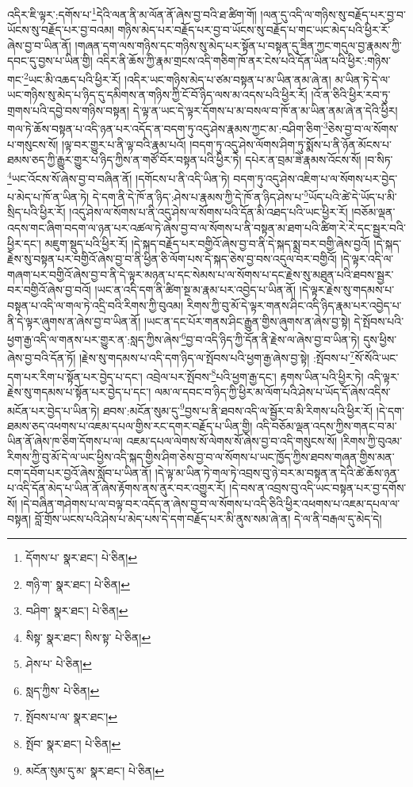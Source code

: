 འདིར་ཇི་ལྟར་:དགོས་པ་\footnote{དོགས་པ་  སྣར་ཐང་།  པེ་ཅིན། }དེའི་ལན་ནི་མ་ལོན་ནོ་ཞེས་བྱ་བའི་ཐ་ཚིག་གོ། །ལན་དུ་འདི་ལ་གཉིས་སུ་བརྗོད་པར་བྱ་བ་ཡོངས་སུ་བརྗོད་པར་བྱ་བའམ། གཉིས་མེད་པར་བརྗོད་པར་བྱ་བ་ཡོངས་སུ་བརྗོད་པ་གང་ཡང་མེད་པའི་ཕྱིར་རོ་ཞེས་བྱ་བ་ཡིན་ནོ། །གཞན་དག་ལས་གཉིས་དང་གཉིས་སུ་མེད་པར་སྟོན་པ་བསྟན་དུ་ཟིན་ཀྱང་གདུལ་བྱ་རྣམས་ཀྱི་དབང་དུ་བྱས་པ་ཡིན་གྱི། འདིར་ནི་ཆོས་ཀྱི་རྣམ་གྲངས་འདི་གཅིག་ཁོ་ནར་ངེས་པའི་དོན་ཡིན་པའི་ཕྱིར་:གཉིས་གང་\footnote{གཉི་ག་  སྣར་ཐང་།  པེ་ཅིན། }ཡང་མི་འཆད་པའི་ཕྱིར་རོ། །འདིར་ཡང་གཉིས་མེད་པ་ཙམ་བསྟན་པ་མ་ཡིན་ནམ་ཞེ་ན། མ་ཡིན་ཏེ་དེ་ལ་ཡང་གཉིས་སུ་མེད་པ་ཉིད་དུ་དམིགས་ན་གཉིས་ཀྱི་ངོ་བོ་ཉིད་ལས་མ་འདས་པའི་ཕྱིར་རོ། །འོ་ན་ཅིའི་ཕྱིར་རབ་ཏུ་གྲགས་པའི་དབྱེ་བས་གཉིས་བསྟན། དེ་ལྟ་ན་ཡང་དེ་ལྟར་དོགས་པ་མ་བསལ་བ་ཁོ་ན་མ་ཡིན་ནམ་ཞེ་ན་དེའི་ཕྱིར། གལ་ཏེ་ཆོས་བསྟན་པ་འདི་ཉན་པར་འདོད་ན་བདག་ཏུ་འདུ་ཤེས་རྣམས་ཀྱང་མ་:བཤིག་ཅིག་\footnote{བཤིག་  སྣར་ཐང་།  པེ་ཅིན། }ཅེས་བྱ་བ་ལ་སོགས་པ་གསུངས་སོ། །ལྟ་བར་གྱུར་པ་ནི་ལྟ་བའི་རྣམ་པའོ། །བདག་ཏུ་འདུ་ཤེས་ལོགས་ཤིག་ཏུ་སྨོས་པ་ནི་ཉོན་མོངས་པ་ཐམས་ཅད་ཀྱི་རྒྱུར་གྱུར་པ་ཉིད་ཀྱིས་ན་གཙོ་བོར་བསྟན་པའི་ཕྱིར་ཏེ། དཔེར་ན་བྲམ་ཟེ་རྣམས་འོངས་སོ། །བ་སིཏ་\footnote{སིསྟ་  སྣར་ཐང་། སིས་སྟ་  པེ་ཅིན། }ཡང་འོངས་སོ་ཞེས་བྱ་བ་བཞིན་ནོ། །དགོངས་པ་ནི་འདི་ཡིན་ཏེ། བདག་ཏུ་འདུ་ཤེས་འཇིག་པ་ལ་སོགས་པར་བྱེད་པ་མེད་པ་ཁོ་ན་ཡིན་ཏེ། དེ་དག་ནི་དེ་ཁོ་ན་ཉིད་:ཤེས་པ་རྣམས་ཀྱི་དེ་ཁོ་ན་ཉིད་ཤེས་པ་\footnote{ཤེས་པ་  པེ་ཅིན། }ཡོད་པའི་ཚེ་དེ་ཡོད་པ་མི་སྲིད་པའི་ཕྱིར་རོ། །འདུ་ཤེས་ལ་སོགས་པ་ནི་འདུ་ཤེས་ལ་སོགས་པའི་དོན་མི་འཐད་པའི་ཡང་ཕྱིར་རོ། །བཅོམ་ལྡན་འདས་གང་ཞིག་བདག་ལ་ཉན་པར་འཚལ་ཏེ་ཞེས་བྱ་བ་ལ་སོགས་པ་ནི་བསྟན་མ་ཐག་པའི་ཚིག་རེ་རེ་དང་སྦྱར་བའི་ཕྱིར་དང་། མཇུག་སྡུད་པའི་ཕྱིར་རོ། །དེ་སྐད་བརྗོད་པར་བགྱིའོ་ཞེས་བྱ་བ་ནི་དེ་སྐད་སྨྲ་བར་བགྱི་ཞེས་བྱའོ། །དེ་སྐད་རྗེས་སུ་བསྟན་པར་བགྱིའོ་ཞེས་བྱ་བ་ནི་ཕྱིན་ཅི་ལོག་པས་དེ་སྐད་ཅེས་བྱ་བས་འདུལ་བར་བགྱིའོ། །དེ་ལྟར་འདི་ལ་གཞག་པར་བགྱིའོ་ཞེས་བྱ་བ་ནི་དེ་ལྟར་མཉན་པ་དང་སེམས་པ་ལ་སོགས་པ་དང་རྗེས་སུ་མཐུན་པའི་ཐབས་སྦྱར་བར་བགྱིའོ་ཞེས་བྱ་བའོ། །ཡང་ན་འདི་དག་ནི་ཚིག་སྔ་མ་རྣམ་པར་འབྱེད་པ་ཡིན་ནོ། །དེ་ལྟར་རྗེས་སུ་གདམས་པ་བསྟན་པ་འདི་ལ་གལ་ཏེ་འདྲི་བའི་རིགས་ཀྱི་བུའམ། རིགས་ཀྱི་བུ་མོ་དེ་ལྟར་གནས་ཤིང་འདི་ཉིད་རྣམ་པར་འབྱེད་པ་ནི་དེ་ལྟར་ཞུགས་ན་ཞེས་བྱ་བ་ཡིན་ནོ། །ཡང་ན་དང་པོར་གནས་ཤིང་རྒྱུན་གྱིས་ཞུགས་ན་ཞེས་བྱ་སྟེ། དེ་སྤོབས་པའི་ཕྱག་རྒྱ་འདི་ལ་གནས་པར་གྱུར་ན་:སླད་ཀྱིས་ཞེས་\footnote{སླད་ཀྱིས་  པེ་ཅིན། }བྱ་བ་འདི་ཉིད་ཀྱི་དོན་ནི་རྗེས་ལ་ཞེས་བྱ་བ་ཡིན་ཏེ། དུས་ཕྱིས་ཞེས་བྱ་བའི་དོན་ཏོ། །རྗེས་སུ་གདམས་པ་འདི་དག་ཉིད་ལ་སྤོབས་པའི་ཕྱག་རྒྱ་ཞེས་བྱ་སྟེ། :སྤོབས་པ་\footnote{སྤོབས་པ་ལ་  སྣར་ཐང་། }སོ་སོའི་ཡང་དག་པར་རིག་པ་སྟོན་པར་བྱེད་པ་དང་། འབྲེལ་པར་སྤོབས་\footnote{སྤོབ་  སྣར་ཐང་།  པེ་ཅིན། }པའི་ཕྱག་རྒྱ་དང་། རྟགས་ཡིན་པའི་ཕྱིར་ཏེ། འདི་ལྟར་རྗེས་སུ་གདམས་པ་སྟོན་པར་བྱེད་པ་དང་། ལམ་ལ་དབང་བ་ཉིད་ཀྱི་ཕྱིར་མ་ལོག་པའི་ཤེས་པ་ཡོད་དོ་ཞེས་འདིས་མངོན་པར་བྱེད་པ་ཡིན་ཏེ། ཐབས་:མངོན་སུམ་དུ་\footnote{མངོན་སུམ་དུ་མ་  སྣར་ཐང་།  པེ་ཅིན། }བྱས་པ་ནི་ཐབས་འདི་ལ་སྦྱོར་བ་མི་རིགས་པའི་ཕྱིར་རོ། །དེ་དག་ཐམས་ཅད་འཕགས་པ་འཇམ་དཔལ་གྱིས་རང་དགར་བརྗོད་པ་ཡིན་གྱི། འདི་བཅོམ་ལྡན་འདས་ཀྱིས་གནང་བ་མ་ཡིན་ནོ་ཞེས་ཁ་ཅིག་དོགས་པ་ལ། འཇམ་དཔལ་ལེགས་སོ་ལེགས་སོ་ཞེས་བྱ་བ་འདི་གསུངས་སོ། །རིགས་ཀྱི་བུའམ་རིགས་ཀྱི་བུ་མོ་དེ་ལ་ཡང་ཕྱིས་འདི་སྐད་གྱིས་ཤིག་ཅེས་བྱ་བ་ལ་སོགས་པ་ཡང་ཁྱོད་ཀྱིས་ཐབས་གཞན་གྱིས་མན་ངག་དབོག་པར་བྱའོ་ཞེས་སློབ་པ་ཡིན་ནོ། །དེ་ལྟ་མ་ཡིན་ཏེ་གལ་ཏེ་འབྲས་བུ་ཉེ་བར་མ་བསྟན་ན་དེའི་ཚེ་ཆོས་ཉན་པ་འདི་དོན་མེད་པ་ཡིན་ནོ་ཞེས་རྟོགས་ནས་ནུར་བར་འགྱུར་རོ། །དེ་བས་ན་འབྲས་བུ་འདི་ཡང་བསྟན་པར་བྱ་དགོས་སོ། །དེ་བཞིན་གཤེགས་པ་ལ་བལྟ་བར་འདོད་ན་ཞེས་བྱ་བ་ལ་སོགས་པ་འདི་ཅིའི་ཕྱིར་འཕགས་པ་འཇམ་དཔལ་ལ་བསྟན། བློ་གྲོས་ཡངས་པའི་ཤེས་པ་མེད་པས་དེ་དག་བརྗོད་པར་མི་ནུས་སམ་ཞེ་ན། དེ་ལ་ནི་བརྒལ་དུ་མེད་དེ། 